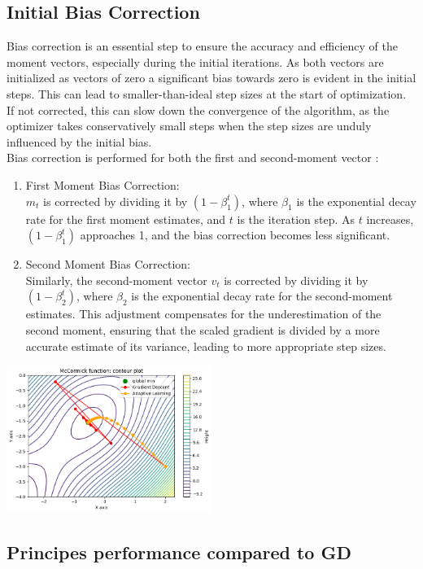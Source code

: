 \documentclass[journal]{IEEEtran}
\begin{document}
\subsection{Initial Bias Correction}
Bias correction is an essential step to ensure the accuracy and efficiency of the moment vectors, especially during the initial iterations. As both vectors are initialized as vectors of zero a significant bias towards zero is evident in the initial steps. This can lead to smaller-than-ideal step sizes at the start of optimization. If not corrected, this can slow down the convergence of the algorithm, as the optimizer takes conservatively small steps when the step sizes are unduly influenced by the initial bias.\\
Bias correction is performed for both the first and second-moment vector :
\begin{enumerate}
    \item First Moment Bias Correction:\\
    \(m_t\) is corrected by dividing it by \((1 - \beta_1^t)\), where \(\beta_1\) is the exponential decay rate for the first moment estimates, and \(t\) is the iteration step. As \(t\) increases, \((1 - \beta_1^t)\) approaches 1, and the bias correction becomes less significant.
    \item Second Moment Bias Correction:\\
    Similarly, the second-moment vector \(v_t\) is corrected by dividing it by \((1 - \beta_2^t)\), where \(\beta_2\) is the exponential decay rate for the second-moment estimates. This adjustment compensates for the underestimation of the second moment, ensuring that the scaled gradient is divided by a more accurate estimate of its variance, leading to more appropriate step sizes.
\end{enumerate}
\includegraphics[width=0.5\textwidth]{report/figures/GD_rmsprop.png}\\

\subsection{Principes performance compared to GD}
\end{document}
